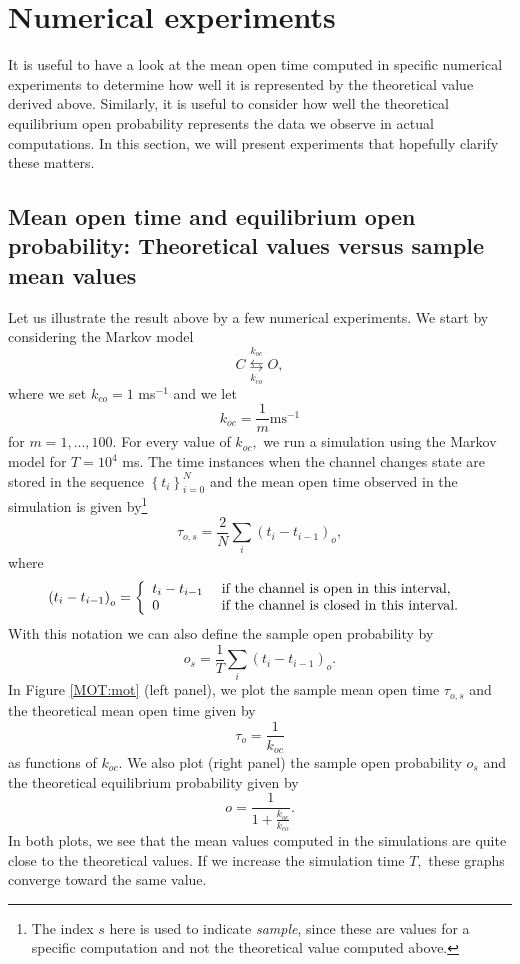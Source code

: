 \section{Numerical experiments}

It is useful to have a look at the mean open time computed in specific
numerical experiments to determine how well it is represented by the theoretical
value derived above. Similarly, it is useful to consider how well the
theoretical equilibrium open probability represents the data we observe in
actual computations. In this section, we will present experiments that
hopefully clarify these matters.

\subsection{Mean open time and equilibrium open probability: Theoretical
values versus sample mean values}

Let us illustrate the result above by a few numerical experiments. We start by
considering the Markov model
\[
C\underset{k_{co}}{\overset{k_{oc}}{\leftrightarrows}}O,
\]
where we set $k_{co}=1$ ms$^{-1}$ and we let
\[
k_{oc}=\frac{1}{m}\text{ms}^{-1}
\]
for $m=1,...,100.$ For every value of $k_{oc},$ we run a simulation using the
Markov model for $T=10^{4}$ ms. The time instances when the channel changes
state are stored in the sequence $\left\{  t_{i}\right\}  _{i=0}^{N}$ and the
mean open time observed in the simulation is given by\footnote{The
index $s$ here is used to indicate {\it sample}, since these are values for a
specific computation and not the theoretical value computed above.}
\[
\tau_{o,s}=\frac{2}{N}\sum_{i}\left(  t_{i}-t_{i-1}\right)  _{o},
\]
where
\[
\left(  t_{i}-t_{i-1}\right)  _{o}=\left\{
\begin{array}
[c]{ll}
t_{i}-t_{i-1}\text{ } & \text{if the channel is open in this interval,}\\
0\text{ } & \text{if the channel is closed in this interval.}
\end{array}
\text{ }\right.
\]
With this notation we can also define the sample open probability by
\[
o_{s}=\frac{1}{T}\sum_{i}\left(  t_{i}-t_{i-1}\right)  _{o}.
\]
In Figure  \ref{MOT:mot} (left panel), we plot the sample mean open time 
$\tau_{o,s}$ and the theoretical mean open time given by
\begin{equation}
\tau_{o}=\frac{1}{k_{oc}} \label{mot2}
\end{equation}
as functions of $k_{oc}.$ We also plot (right panel) the sample open
probability $o_{s}$ and the theoretical equilibrium probability given by
\begin{equation}
o=\frac{1}{1+\frac{k_{oc}}{k_{co}}}. \label{mot3}
\end{equation}
In both plots, we see that the mean values computed in the simulations are
quite close to the theoretical values. If we increase the simulation time $T,$
these graphs converge toward the same value.

